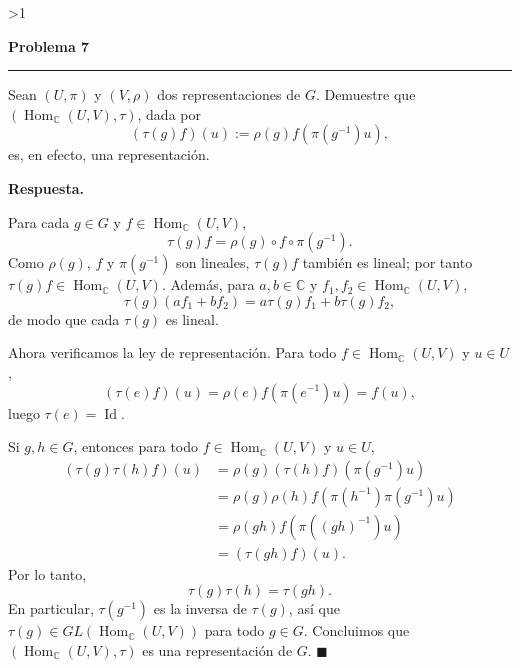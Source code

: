 \documentclass[10pt,a4paper]{article}
\newcommand{\CC}{\mathbb{C}}
\newcommand{\Hom}{\operatorname{Hom}}
\newcommand{\Id}{\operatorname{Id}}
\newcommand{\inlinehead}[2][repblue]{%
  \par\smallskip
  {\color{#1}\bfseries #2.}\hspace{0.45em}%
}
\newcommand{\answer}{\inlinehead{Respuesta}}
\newcounter{probcnt}
\newcommand{\problem}[2]{%
  \stepcounter{probcnt}%
  \ifnum\value{probcnt}>1\newpage\fi
  \par\vspace{0.25em}
  {\large\bfseries\color{repblue} Problema #1}\par
  {\color{repline}\rule{\linewidth}{0.55pt}}\par
  \begin{tcolorbox}[
    breakable,
    colback=white,
    colframe=repline,
    borderline west={1.6pt}{0pt}{repteal},
    left=0.7em,
    right=0.7em,
    top=0.35em,
    bottom=0.3em,
    before skip=0.35em,
    after skip=0.45em
  ]
    #2
  \end{tcolorbox}
}
\begin{document}
\problem{7}{%
Sean $(U,\pi)$ y $(V,\rho)$ dos representaciones de $G$. Demuestre que
$(\Hom_{\CC}(U, V), \tau)$, dada por
\[
  (\tau(g)f)(u) := \rho(g)f(\pi(g^{-1})u),
\]
es, en efecto, una representación.
}

\answer
Para cada $g\in G$ y $f\in\Hom_{\CC}(U,V)$,
\[
  \tau(g)f=\rho(g)\circ f\circ \pi(g^{-1}).
\]
Como $\rho(g)$, $f$ y $\pi(g^{-1})$ son lineales, $\tau(g)f$ también es lineal;
por tanto $\tau(g)f\in\Hom_{\CC}(U,V)$. Además, para $a,b\in\CC$ y
$f_1,f_2\in\Hom_{\CC}(U,V)$,
\[
  \tau(g)(af_1+bf_2)=a\tau(g)f_1+b\tau(g)f_2,
\]
de modo que cada $\tau(g)$ es lineal.

Ahora verificamos la ley de representación. Para todo $f\in\Hom_{\CC}(U,V)$ y
$u\in U$,
\[
  (\tau(e)f)(u)=\rho(e)f(\pi(e^{-1})u)=f(u),
\]
luego $\tau(e)=\Id$.

Si $g,h\in G$, entonces para todo $f\in\Hom_{\CC}(U,V)$ y $u\in U$,
\begin{align*}
  (\tau(g)\tau(h)f)(u)
  &=\rho(g)(\tau(h)f)(\pi(g^{-1})u) \\
  &=\rho(g)\rho(h)f(\pi(h^{-1})\pi(g^{-1})u) \\
  &=\rho(gh)f(\pi((gh)^{-1})u) \\
  &=(\tau(gh)f)(u).
\end{align*}
Por lo tanto,
\[
  \tau(g)\tau(h)=\tau(gh).
\]
En particular, $\tau(g^{-1})$ es la inversa de $\tau(g)$, así que
$\tau(g)\in GL(\Hom_{\CC}(U,V))$ para todo $g\in G$. Concluimos que
$(\Hom_{\CC}(U,V),\tau)$ es una representación de $G$. \hfill$\blacksquare$
\end{document}
